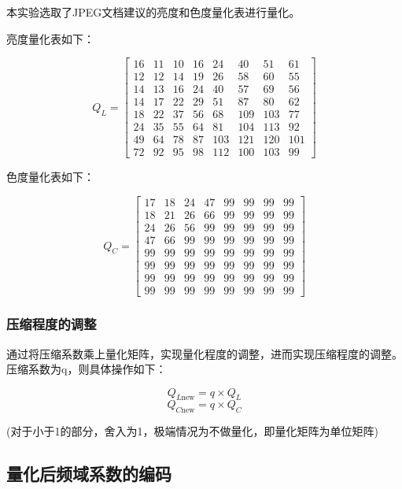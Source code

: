 \documentclass{article}
\begin{document}
本实验选取了JPEG文档建议的亮度和色度量化表进行量化。

亮度量化表如下：

$$
Q_L=\begin{bmatrix}
16 & 11 & 10 & 16 & 24 & 40 & 51 & 61 \\
12 & 12 & 14 & 19 & 26 & 58 & 60 & 55 \\
14 & 13 & 16 & 24 & 40 & 57 & 69 & 56 \\
14 & 17 & 22 & 29 & 51 & 87 & 80 & 62 \\
18 & 22 & 37 & 56 & 68 & 109 & 103 & 77 \\
24 & 35 & 55 & 64 & 81 & 104 & 113 & 92 \\
49 & 64 & 78 & 87 & 103 & 121 & 120 & 101 \\
72 & 92 & 95 & 98 & 112 & 100 & 103 & 99
\end{bmatrix}
$$

色度量化表如下：

$$
Q_C=\begin{bmatrix}
17 & 18 & 24 & 47 & 99 & 99 & 99 & 99 \\
18 & 21 & 26 & 66 & 99 & 99 & 99 & 99 \\
24 & 26 & 56 & 99 & 99 & 99 & 99 & 99 \\
47 & 66 & 99 & 99 & 99 & 99 & 99 & 99 \\
99 & 99 & 99 & 99 & 99 & 99 & 99 & 99 \\
99 & 99 & 99 & 99 & 99 & 99 & 99 & 99 \\
99 & 99 & 99 & 99 & 99 & 99 & 99 & 99 \\
99 & 99 & 99 & 99 & 99 & 99 & 99 & 99
\end{bmatrix}
$$


\subsubsection{压缩程度的调整}

通过将压缩系数乘上量化矩阵，实现量化程度的调整，进而实现压缩程度的调整。压缩系数为q，则具体操作如下：

$$
Q_{L\text{new}} = q\times Q_L
$$
$$
Q_{C\text{new}} = q\times Q_C
$$

\begin{center}
    (对于小于1的部分，舍入为1，极端情况为不做量化，即量化矩阵为单位矩阵)
\end{center}

\subsection{量化后频域系数的编码}
\end{document}
